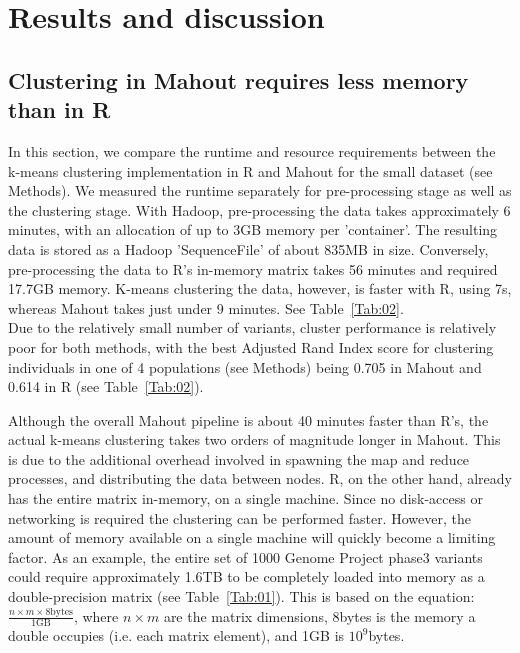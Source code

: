 \documentclass{bioinfo}
\begin{document}


\section*{Results and discussion}

\subsection*{Clustering in Mahout requires less memory than in R}
In this section, we compare the runtime and resource requirements between the k-means clustering implementation in R and Mahout for the small \NinteenPhaseone{} dataset (see Methods). 
We measured the runtime separately for pre-processing stage as well as the clustering stage. 
With Hadoop, pre-processing the data takes approximately 6 minutes, with an allocation of up to 3GB memory per 'container'. The resulting data is stored as a Hadoop 'SequenceFile' of about 835MB in size.
Conversely,  pre-processing the data to R's in-memory matrix takes 56 minutes and required 17.7GB memory. 
K-means clustering the data, however, is faster with R, using 7s, whereas Mahout takes just under 9 minutes. See Table~\ref{Tab:02}. \\
Due to the relatively small number of variants, cluster performance is relatively poor for both methods, with the best Adjusted Rand Index score for clustering individuals in one of 4 populations (see Methods) being 0.705 in Mahout and 0.614 in R (see Table~\ref{Tab:02}).

Although the overall Mahout pipeline is about 40 minutes faster than R's, the actual k-means clustering takes two orders of magnitude longer in Mahout. 
This is due to the additional overhead involved in spawning the map and reduce processes, and distributing the data between nodes.
R, on the other hand, already has the entire matrix in-memory, on a single machine. 
Since no disk-access or networking is required the clustering can be performed faster. However, the amount of memory available on a single machine will quickly become a limiting factor. 
As an example, the entire set of 1000 Genome Project phase3 variants could require approximately 1.6TB to be completely loaded into memory as a double-precision matrix (see Table~\ref{Tab:01}). This is based on the equation:
$\frac{n \times m \times 8\text{bytes}}{1\text{GB}}$, where $n \times m$ are the matrix dimensions, 8bytes is the memory a double occupies (i.e. each matrix element), and  1GB is $10^9$bytes.
\end{document}
